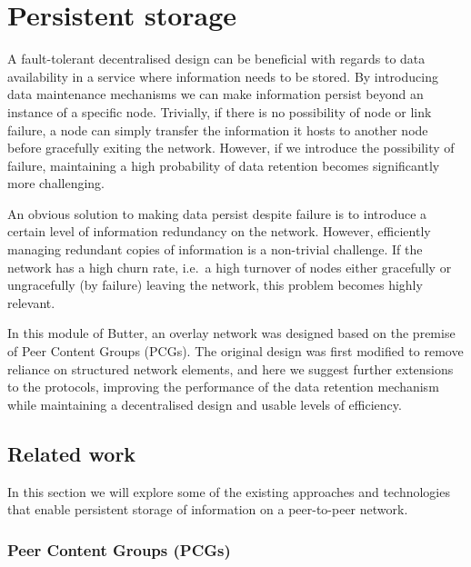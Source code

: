 \newpage


\section{Persistent storage}
\label{sec:persistentStorage}

A fault-tolerant decentralised design can be beneficial with regards to data availability in a service where information needs to be stored. By introducing data maintenance mechanisms we can make information persist beyond an instance of a specific node. Trivially, if there is no possibility of node or link failure, a node can simply transfer the information it hosts to another node before gracefully exiting the network. However, if we introduce the possibility of failure, maintaining a high probability of data retention becomes significantly more challenging.\cite{shinebourne2022availability}

An obvious solution to making data persist despite failure is to introduce a certain level of information redundancy on the network. However, efficiently managing redundant copies of information is a non-trivial challenge. If the network has a high churn rate, i.e.\ a high turnover of nodes either gracefully or ungracefully (by failure) leaving the network, this problem becomes highly relevant\cite{duarte2014reliable, ranganathan2002replication}.

In this module of Butter, an overlay network was designed based on the premise of Peer Content Groups (PCGs)\cite{duarte2014reliable}. The original design was first modified to remove reliance on structured network elements\cite{shinebourne2022availability, duarte2014reliable}, and here we suggest further extensions to the protocols, improving the performance of the data retention mechanism while maintaining a decentralised design and usable levels of efficiency.

\subsection{Related work}

In this section we will explore some of the existing approaches and technologies that enable persistent storage of information on a peer-to-peer network.

\subsubsection{Peer Content Groups (PCGs)}
\label{sssec:pcgAvailability}

